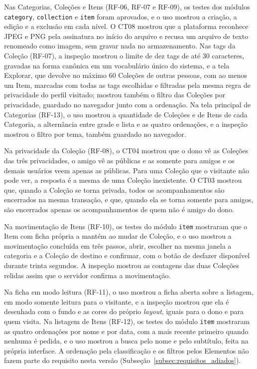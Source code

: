 Nas Categorias, Coleções e Itens (RF-06, RF-07 e RF-09), os testes dos módulos \texttt{category}, \texttt{collection} e \texttt{item} foram aprovados,
e o uso mostrou a criação, a edição e a exclusão em cada nível. O CT08 mostrou que a plataforma reconhece JPEG e PNG pela assinatura no início do arquivo
e recusa um arquivo de texto renomeado como imagem, sem gravar nada no armazenamento. Nas tags da Coleção (RF-07), a inspeção mostrou o limite de dez tags
de até 30 caracteres, gravadas na forma canônica em um vocabulário único do sistema, e a tela Explorar, que devolve no máximo 60 Coleções de outras pessoas,
com ao menos um Item, marcadas com todas as tags escolhidas e filtradas pela mesma regra de privacidade do perfil visitado; mostrou também o filtro das
Coleções por privacidade, guardado no navegador junto com a ordenação. Na tela principal de Categorias (RF-13), o uso mostrou a quantidade
de Coleções e de Itens de cada Categoria, a alternância entre grade e lista e as quatro ordenações, e a inspeção mostrou o filtro por tema, também guardado
no navegador.

Na privacidade da Coleção (RF-08), o CT04 mostrou que o dono vê as Coleções das três privacidades, o amigo vê as públicas e as somente para amigos e
os demais usuários veem apenas as públicas. Para uma Coleção que o visitante não pode ver, a resposta é a mesma de uma Coleção inexistente. O CT03 mostrou
que, quando a Coleção se torna privada, todos os acompanhamentos são encerrados na mesma transação, e que, quando ela se torna somente para amigos,
são encerrados apenas os acompanhamentos de quem não é amigo do dono.

Na movimentação de Itens (RF-10), os testes do módulo \texttt{item} mostraram que o Item com ficha própria a mantém ao mudar de Coleção, e o uso mostrou
a movimentação concluída em três passos, abrir, escolher na mesma janela a categoria e a Coleção de destino e confirmar, com o botão de desfazer disponível
durante trinta segundos. A inspeção mostrou as contagens das duas Coleções relidas assim que o servidor confirma a movimentação.

Na ficha em modo leitura (RF-11), o uso mostrou a ficha aberta sobre a listagem, em modo somente leitura para o visitante, e a inspeção mostrou que ela é desenhada
com o fundo e as cores do próprio \textit{layout}, iguais para o dono e para quem visita. Na listagem de Itens (RF-12),
os testes do módulo \texttt{item} mostraram as quatro ordenações por nome e por data, com a mais recente primeiro quando nenhuma é pedida, e o uso mostrou
a busca pelo nome e pelo subtítulo, feita na própria interface. A ordenação pela classificação e os filtros pelos Elementos não fazem parte do requisito
nesta versão (Subseção~\ref{subsec:requisitos_adiados}).

